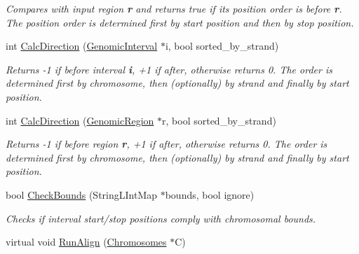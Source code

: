 \begin{CompactItemize}
\begin{CompactList}\small\item\em Compares with input region {\bf r} and returns true if its position order is before {\bf r}. The position order is determined first by start position and then by stop position. \item\end{CompactList}\item 
\hypertarget{classGenomicRegion_da548684fc4ae44dd3782aa15eaaf0a8}{
int \hyperlink{classGenomicRegion_da548684fc4ae44dd3782aa15eaaf0a8}{CalcDirection} (\hyperlink{classGenomicInterval}{GenomicInterval} $\ast$i, bool sorted\_\-by\_\-strand)}
\label{classGenomicRegion_da548684fc4ae44dd3782aa15eaaf0a8}

\begin{CompactList}\small\item\em Returns -1 if before interval {\bf i}, +1 if after, otherwise returns 0. The order is determined first by chromosome, then (optionally) by strand and finally by start position. \item\end{CompactList}\item 
\hypertarget{classGenomicRegion_b44366e44dc9a83da65b9593ce90dd32}{
int \hyperlink{classGenomicRegion_b44366e44dc9a83da65b9593ce90dd32}{CalcDirection} (\hyperlink{classGenomicRegion}{GenomicRegion} $\ast$r, bool sorted\_\-by\_\-strand)}
\label{classGenomicRegion_b44366e44dc9a83da65b9593ce90dd32}

\begin{CompactList}\small\item\em Returns -1 if before region {\bf r}, +1 if after, otherwise returns 0. The order is determined first by chromosome, then (optionally) by strand and finally by start position. \item\end{CompactList}\item 
\hypertarget{classGenomicRegion_2a99aedb0632fd7e1f2f8dc995ba9191}{
bool \hyperlink{classGenomicRegion_2a99aedb0632fd7e1f2f8dc995ba9191}{CheckBounds} (StringLIntMap $\ast$bounds, bool ignore)}
\label{classGenomicRegion_2a99aedb0632fd7e1f2f8dc995ba9191}

\begin{CompactList}\small\item\em Checks if interval start/stop positions comply with chromosomal bounds. \item\end{CompactList}\item 
\hypertarget{classGenomicRegion_90b0382a60f0a8532af73fc18f41364b}{
virtual void \hyperlink{classGenomicRegion_90b0382a60f0a8532af73fc18f41364b}{RunAlign} (\hyperlink{classChromosomes}{Chromosomes} $\ast$C)}
\label{classGenomicRegion_90b0382a60f0a8532af73fc18f41364b}


\end{CompactItemize}
